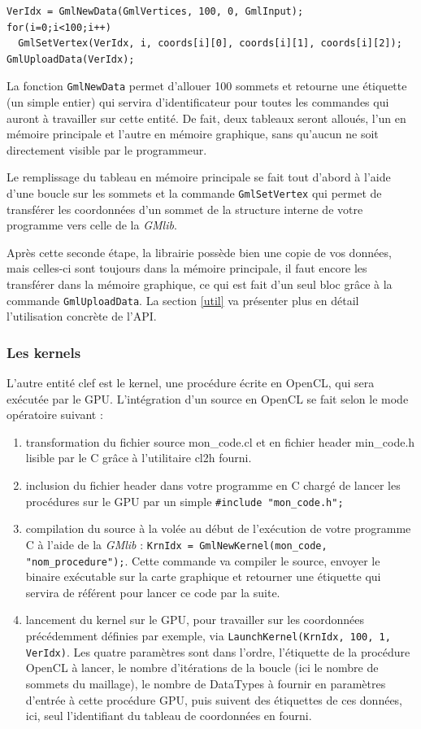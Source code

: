 \documentclass[a4paper,12pt]{article}
\begin{document}
\begin{tt}
\begin{verbatim}
VerIdx = GmlNewData(GmlVertices, 100, 0, GmlInput);
for(i=0;i<100;i++)
  GmlSetVertex(VerIdx, i, coords[i][0], coords[i][1], coords[i][2]);
GmlUploadData(VerIdx);
\end{verbatim}
\end{tt}
\normalfont

La fonction {\tt GmlNewData} permet d'allouer 100 sommets et retourne une étiquette (un simple entier) qui servira d'identificateur pour toutes les commandes qui auront à travailler sur cette entité. De fait, deux tableaux seront alloués, l'un en mémoire principale et l'autre en mémoire graphique, sans qu'aucun ne soit directement visible par le programmeur.

Le remplissage du tableau en mémoire principale se fait tout d'abord à l'aide d'une boucle sur les sommets et la commande {\tt GmlSetVertex} qui permet de transférer les coordonnées d'un sommet de la structure interne de votre programme vers celle de la \emph{GMlib}.

Après cette seconde étape, la librairie possède bien une copie de vos données, mais celles-ci sont toujours dans la mémoire principale, il faut encore les transférer dans la mémoire graphique, ce qui est fait d'un seul bloc grâce à la commande {\tt GmlUploadData}. La section \ref{util} va présenter plus en détail l'utilisation concrète de l'API.

\subsubsection*{Les kernels}
L'autre entité clef est le kernel, une procédure écrite en OpenCL, qui sera exécutée par le GPU. L'intégration d'un source en OpenCL se fait selon le mode opératoire suivant :

\begin{enumerate}
\item transformation du fichier source mon\_code.cl et en fichier header min\_code.h lisible par le C grâce à l'utilitaire cl2h fourni.
\item inclusion du fichier header dans votre programme en C chargé de lancer les procédures sur le GPU par un simple {\tt \#include "mon\_code.h";}
\item compilation du source à la volée au début de l'exécution de votre programme C à l'aide de la \emph{GMlib} : {\tt KrnIdx = GmlNewKernel(mon\_code, "nom\_procedure");}. Cette commande va compiler le source, envoyer le binaire exécutable sur la carte graphique et retourner une étiquette qui servira de référent pour lancer ce code par la suite.
\item lancement du kernel sur le GPU, pour travailler sur les coordonnées précédemment définies par exemple, via {\tt LaunchKernel(KrnIdx, 100, 1, VerIdx)}. Les quatre paramètres sont dans l'ordre, l'étiquette de la procédure OpenCL à lancer, le nombre d'itérations de la boucle (ici le nombre de sommets du maillage), le nombre de DataTypes à fournir en paramètres d'entrée à cette procédure GPU, puis suivent des étiquettes de ces données, ici, seul l'identifiant du tableau de coordonnées en fourni.
\end{enumerate}
\end{document}
